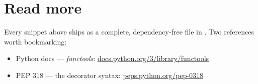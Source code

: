 \section{Read more}

Every snippet above ships as a complete, dependency-free file in . Two references worth bookmarking:
\begin{itemize}
  \item Python docs — \emph{functools}: \href{https://docs.python.org/3/library/functools.html}{docs.python.org/3/library/functools}
  \item PEP 318 — the decorator syntax: \href{https://peps.python.org/pep-0318/}{peps.python.org/pep-0318}
\end{itemize}



